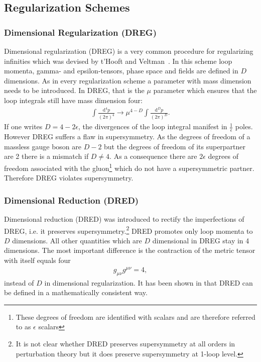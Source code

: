\subsection{Regularization Schemes}\label{sec:RegSchemes}
\subsubsection*{Dimensional Regularization (DREG)}
Dimensional regularization (DREG) is a very common procedure for regularizing infinities which was devised by t'Hooft and Veltman~\cite{'tHooft:1972fi}. In this scheme loop momenta, gamma- and epsilon-tensors, phase space and fields are defined in $D$ dimensions\cite{Collins:105730}. As in every regularization scheme a parameter with mass dimension needs to be introduced. In DREG, that is the $\mu$ parameter which ensures that the loop integrals still have mass dimension four:
\begin{align}
\int \frac{\mbox{d}^4p}{(2\pi)^4} \to \mu^{4-D} \int \frac{\mbox{d}^Dp}{(2\pi)^D}.
\end{align}
If one writes $D=4-2\epsilon$, the divergences of the loop integral manifest in $\frac{1}{\epsilon}$ poles.\\
However DREG suffers a flaw in supersymmetry. As the degrees of freedom of a massless gauge boson are $D-2$ but the degrees of freedom of its superpartner are 2 there is a mismatch if $D \neq 4$. As a consequence there are $2\epsilon$ degrees of freedom associated with the gluon\footnote{These degrees of freedom are identified with scalars and are therefore referred to as $\epsilon$ scalars} which do not have a supersymmetric partner. Therefore DREG violates supersymmetry.

\subsubsection*{Dimensional Reduction (DRED)}
Dimensional reduction (DRED) was introduced to rectify the imperfections of DREG, i.e. it preserves supersymmetry.\footnote{It is not clear whether DRED preserves supersymmetry at all orders in perturbation theory\cite{Jack:1997sr} but it does preserve supersymmetry at 1-loop level\cite{Hollik:2001cz}.} DRED promotes only loop momenta to $D$ dimensions. All other quantities which are $D$ dimensional in DREG stay in 4 dimensions. The most important difference is the contraction of the metric tensor with itself equals four
\begin{align}
g_{\mu\nu}g^{\mu\nu} = 4,
\end{align}
instead of $D$ in dimensional regularization. It has been shown in \cite{Stockinger:2005gx} that DRED can be defined in a mathematically consistent way.


